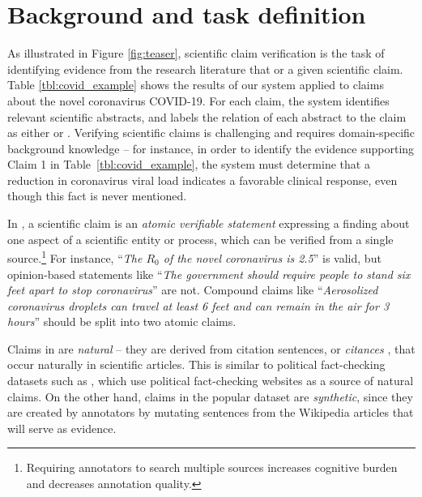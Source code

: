 \section{Background and task definition}

As illustrated in Figure \ref{fig:teaser}, scientific claim verification  is the task of identifying evidence from the research literature that \supports or  a given scientific claim. Table \ref{tbl:covid_example} shows the results of our system  applied to claims about the novel coronavirus COVID-19. For each claim, the system identifies relevant scientific abstracts, and labels the relation of each abstract to the claim as either \supports or . Verifying scientific claims is challenging and requires domain-specific background knowledge -- for instance, in order to identify the evidence supporting Claim 1 in  Table~\ref{tbl:covid_example}, the system must determine that a reduction in coronavirus viral load indicates a favorable clinical response, even though this fact is never mentioned. %

\vspace{.2cm}
 \label{sec:claims} In \ours, a scientific claim is an \emph{atomic verifiable statement} expressing a finding about one aspect of a scientific entity or process, which can be verified from a single source.\footnote{Requiring annotators to search multiple sources increases cognitive burden and decreases annotation quality.}
For instance,  ``\emph{The $R_0$ of the novel coronavirus is 2.5}'' is valid, but opinion-based statements like ``\emph{The government should require people to stand six feet apart to stop coronavirus}'' are not. Compound claims like ``\emph{Aerosolized coronavirus droplets can travel at least 6 feet and can remain in the air for 3 hours}'' should be split into two atomic claims. %

Claims in \ours  are \emph{natural} -- they are derived from citation sentences, or \emph{citances} \cite{Nakov2004CitancesC}, that occur naturally in scientific articles. This is similar to political fact-checking datasets such as \snopes \cite{Hanselowski2019ARA}, which use political fact-checking websites as a source of natural claims. On the other hand, claims in the popular \fever dataset \cite{Thorne2018FEVERAL} are \emph{synthetic}, since they are created by annotators by mutating sentences from the Wikipedia articles that will serve as evidence.

